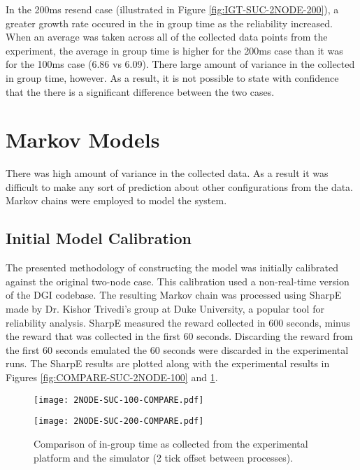 In the 200ms resend case (illustrated in Figure \ref{fig:IGT-SUC-2NODE-200}), a greater growth rate occured in the in group time as the reliability increased.
When an average was taken across all of the collected data points from the experiment, the average in group time is higher for the 200ms case than it was for the 100ms case (6.86 vs 6.09).
There large amount of variance in the collected in group time, however.
As a result, it is not possible to state with confidence that the there is a significant difference between the two cases.

\section{Markov Models}

There was high amount of variance in the collected data.
As a result it was difficult to make any sort of prediction about other configurations from the data.
Markov chains were employed to model the system.

\subsection{Initial Model Calibration}

The presented methodology of constructing the model was initially calibrated against the original two-node case.
This calibration used a non-real-time version of the DGI codebase.
The resulting Markov chain was processed using SharpE \cite{SHARPE}\cite{SHARPE2} made by Dr. Kishor Trivedi's group at Duke University, a popular tool for reliability analysis.
SharpE measured the reward collected in 600 seconds, minus the reward that was collected in the first 60 seconds. 
Discarding the reward from the first 60 seconds emulated the 60 seconds were discarded in the experimental runs.
The SharpE results are plotted along with the experimental results in Figures \ref{fig:COMPARE-SUC-2NODE-100} and \ref{fig:COMPARE-SUC-2NODE-200}.

\begin{figure}
\centering
\begin{minipage}{0.45\textwidth}
    \centering
    \texttt{[image: 2NODE-SUC-100-COMPARE.pdf]}
    \caption{Comparison of in-group time as collected from the experimental platform and the simulator (1 tick offset between processes).}
    \label{fig:COMPARE-SUC-2NODE-100}
\end{minipage}%
\qquad
\begin{minipage}{0.45\textwidth}
    \centering
    \texttt{[image: 2NODE-SUC-200-COMPARE.pdf]}
    \caption{Comparison of in-group time as collected from the experimental platform and the simulator (2 tick offset between processes).}
    \label{fig:COMPARE-SUC-2NODE-200}
\end{minipage}
\end{figure}

